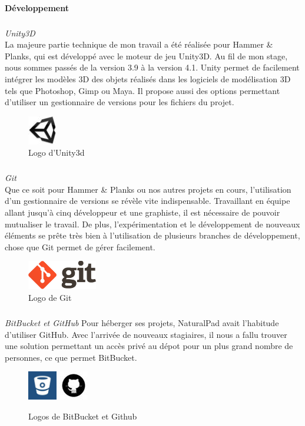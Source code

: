 		\paragraph{Développement}		
		\subparagraph{} \emph{Unity3D\\}
La majeure partie technique de mon travail a été réalisée pour Hammer \& Planks, qui est développé avec le moteur de jeu Unity3D. Au fil de mon stage, nous sommes passés de la version 3.9 à la version 4.1. Unity permet de facilement intégrer les modèles 3D des objets réalisés dans les logiciels de modélisation 3D tels que Photoshop, Gimp ou Maya. Il propose aussi des options permettant d'utiliser un gestionnaire de versions pour les fichiers du projet.
	\begin{figure}[!h]
		\centering
		\includegraphics[height=48px]{images/unity.jpg}
		\caption{Logo d'Unity3d}
		\label{Logo d'Unity3d}
	\end{figure}

		\subparagraph{} \emph{Git\\}
Que ce soit pour Hammer \& Planks ou nos autres projets en cours, l'utilisation d'un gestionnaire de versions se révèle vite indispensable. Travaillant en équipe allant jusqu'à cinq développeur et une graphiste, il est nécessaire de pouvoir mutualiser le travail. De plus, l'expérimentation et le développement de nouveaux éléments se prête très bien à l'utilisation de plusieurs branches de développement, chose que Git permet de gérer facilement.
	\begin{figure}[!h]
		\centering
		\includegraphics[height=48px]{images/git.png}
		\caption{Logo de Git}
		\label{Logo de Git}
	\end{figure}

		\subparagraph{}	\emph{BitBucket et GitHub}
Pour héberger ses projets, NaturalPad avait l'habitude d'utiliser GitHub. Avec l'arrivée de nouveaux stagiaires, il nous a fallu trouver une solution permettant un accès privé au dépot pour un plus grand nombre de personnes, ce que permet BitBucket.
	\begin{figure}[!h]
		\centering
		\includegraphics[height=48px]{images/bitbucket.jpg}
		\includegraphics[height=48px]{images/github.jpg}
		\caption{Logos de BitBucket et Github}
		\label{Logos de BitBucket et Github}
	\end{figure}


